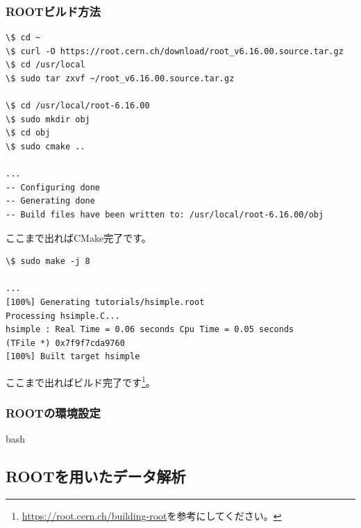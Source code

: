 \documentclass[uplatex,10pt,a4j]{jsarticle}
\begin{document}
\subsubsection{ROOTビルド方法}

\begin{lstlisting}
\$ cd ~
\$ curl -O https://root.cern.ch/download/root_v6.16.00.source.tar.gz
\$ cd /usr/local
\$ sudo tar zxvf ~/root_v6.16.00.source.tar.gz

\$ cd /usr/local/root-6.16.00
\$ sudo mkdir obj
\$ cd obj
\$ sudo cmake ..

...
-- Configuring done
-- Generating done
-- Build files have been written to: /usr/local/root-6.16.00/obj 
\end{lstlisting}

ここまで出ればCMake完了です。

\begin{lstlisting}[escapechar=!]
\$ sudo make -j 8

...
[100%] Generating tutorials/hsimple.root
Processing hsimple.C...
hsimple : Real Time = 0.06 seconds Cpu Time = 0.05 seconds
(TFile *) 0x7f9f7cda9760
[100%] Built target hsimple 
\end{lstlisting}

ここまで出ればビルド完了です\footnote{\url{https://root.cern.ch/building-root}を参考にしてください。}。

\subsubsection{ROOTの環境設定}

bash

\subsection{ROOTを用いたデータ解析}
\end{document}
